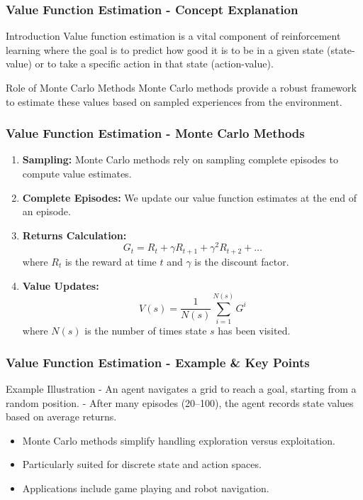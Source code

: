\documentclass[aspectratio=169]{beamer}
\begin{document}
\begin{frame}[fragile]
    \frametitle{Value Function Estimation - Concept Explanation}
    \begin{block}{Introduction}
        Value function estimation is a vital component of reinforcement learning where the goal is to predict how good it is to be in a given state (state-value) or to take a specific action in that state (action-value).
    \end{block}
    \begin{block}{Role of Monte Carlo Methods}
        Monte Carlo methods provide a robust framework to estimate these values based on sampled experiences from the environment.
    \end{block}
\end{frame}

\begin{frame}[fragile]
    \frametitle{Value Function Estimation - Monte Carlo Methods}
    \begin{enumerate}
        \item \textbf{Sampling:} Monte Carlo methods rely on sampling complete episodes to compute value estimates.
        \item \textbf{Complete Episodes:} We update our value function estimates at the end of an episode.
        \item \textbf{Returns Calculation:}
            \begin{equation}
            G_t = R_t + \gamma R_{t+1} + \gamma^2 R_{t+2} + \ldots
            \end{equation}
            where \( R_t \) is the reward at time \( t \) and \( \gamma \) is the discount factor.
        \item \textbf{Value Updates:}
            \begin{equation}
            V(s) = \frac{1}{N(s)} \sum_{i=1}^{N(s)} G^i
            \end{equation}
            where \( N(s) \) is the number of times state \( s \) has been visited.
    \end{enumerate}
\end{frame}

\begin{frame}[fragile]
    \frametitle{Value Function Estimation - Example & Key Points}
    \begin{block}{Example Illustration}
        - An agent navigates a grid to reach a goal, starting from a random position.
        - After many episodes (20–100), the agent records state values based on average returns.
    \end{block}
    \begin{itemize}
        \item Monte Carlo methods simplify handling exploration versus exploitation.
        \item Particularly suited for discrete state and action spaces.
        \item Applications include game playing and robot navigation.
    \end{itemize}
\end{frame}
\end{document}
